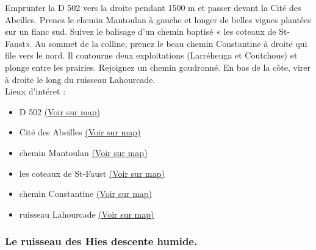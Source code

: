\documentclass[titlepage]{article}
\begin{document}
                        Emprunter la D 502 vers la droite pendant 1500 m et passer devant la Cité des Abeilles. Prenez le chemin Mantoulan à gauche et longer de belles vignes plantées sur un flanc sud. Suivez le balisage d'un chemin baptisé « les coteaux de St-Faust». Au sommet de la colline, prenez le beau chemin Constantine à droite qui file vers le nord. Il contourne deux exploitations (Larréheuga et Coutchous) et plonge entre les prairies. Rejoignez un chemin goudronné. En bas de la côte, virer à droite le long du ruisseau Lahourcade.
                    \\
        Lieux d'intéret : 
        \begin{itemize}
        
        \item {
        D 502 
        \href{https://www.google.com/maps/?q=43.287530, -0.391115}{(Voir sur map)}
        }
    
        \item {
        Cité des
                            Abeilles 
        \href{https://www.google.com/maps/?q=43.287530, -0.391115}{(Voir sur map)}
        }
    
        \item {
        chemin
                            Mantoulan 
        \href{https://www.google.com/maps/?q=43.287530, -0.391115}{(Voir sur map)}
        }
    
        \item {
        les coteaux de
                            St-Faust 
        \href{https://www.google.com/maps/?q=43.287530, -0.391115}{(Voir sur map)}
        }
    
        \item {
        chemin
                            Constantine 
        \href{https://www.google.com/maps/?q=43.287530, -0.391115}{(Voir sur map)}
        }
    
        \item {
        ruisseau
                            Lahourcade 
        \href{https://www.google.com/maps/?q=43.287530, -0.391115}{(Voir sur map)}
        }
    
        \end{itemize}
    
        
        \subsubsection{Le ruisseau des Hies descente humide.}
        \paragraph{}
        
\end{document}
